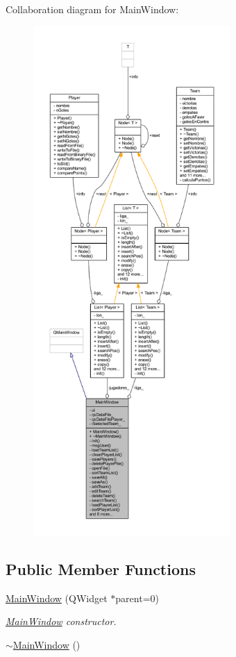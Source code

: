 Collaboration diagram for Main\+Window\+:\nopagebreak
\begin{figure}[H]
\begin{center}
\leavevmode
\includegraphics[height=550pt]{d0/db8/class_main_window__coll__graph}
\end{center}
\end{figure}
\subsection*{Public Member Functions}
\begin{DoxyCompactItemize}
\item 
\hyperlink{class_main_window_a8b244be8b7b7db1b08de2a2acb9409db}{Main\+Window} (Q\+Widget $\ast$parent=0)
\begin{DoxyCompactList}\small\item\em \hyperlink{class_main_window}{Main\+Window} constructor. \end{DoxyCompactList}\item 
\hyperlink{class_main_window_ae98d00a93bc118200eeef9f9bba1dba7}{$\sim$\+Main\+Window} ()
\end{DoxyCompactItemize}
